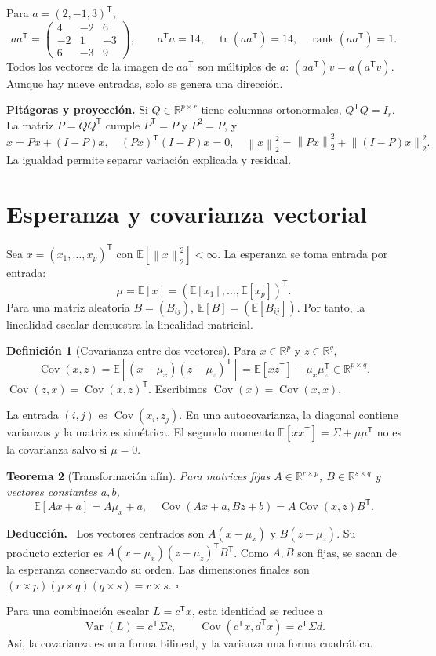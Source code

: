 \documentclass[11pt,a4paper]{article}
\newcommand{\R}{\mathbb R}
\newcommand{\E}{\mathbb E}
\newcommand{\T}{^{\mathsf T}}
\newcommand{\norm}[1]{\left\lVert #1\right\rVert}
\DeclareMathOperator{\Var}{Var}
\DeclareMathOperator{\Cov}{Cov}
\DeclareMathOperator{\tr}{tr}
\DeclareMathOperator{\rank}{rank}
\newcommand{\topic}[2]{\clearpage\section{#1}\label{#2}}
\newenvironment{deduccion}{\par\textbf{Deducción.}\ }{\hfill$\square$\par}
\newtheorem{teorema}{Teorema}[section]
\theoremstyle{definition}\newtheorem{definicion}[teorema]{Definición}
\begin{document}
\begin{ejemplo}
Para $a=(2,-1,3)\T$,
\[
aa\T=\begin{pmatrix}4&-2&6\\-2&1&-3\\6&-3&9\end{pmatrix},
\qquad a\T a=14,\quad \tr(aa\T)=14,\quad \rank(aa\T)=1.
\]
Todos los vectores de la imagen de $aa\T$ son múltiplos de $a$:
$(aa\T)v=a(a\T v)$. Aunque hay nueve entradas, solo se genera una dirección.
\end{ejemplo}
\textbf{Pitágoras y proyección.}
Si $Q\in\R^{p\times r}$ tiene columnas ortonormales, $Q\T Q=I_r$.
La matriz $P=QQ\T$ cumple $P\T=P$ y $P^2=P$, y
\[
x=Px+(I-P)x,\quad
(Px)\T(I-P)x=0,\quad
\norm x_2^2=\norm{Px}_2^2+\norm{(I-P)x}_2^2.
\]
La igualdad permite separar variación explicada y residual.

\topic{Esperanza y covarianza vectorial}{s12}
Sea $x=(x_1,\ldots,x_p)\T$ con $\E[\norm x_2^2]<\infty$.
La esperanza se toma entrada por entrada:
\[
\mu=\E[x]=(\E[x_1],\ldots,\E[x_p])\T.
\]
Para una matriz aleatoria $B=(B_{ij})$, $\E[B]=(\E[B_{ij}])$.
Por tanto, la linealidad escalar demuestra la linealidad matricial.

\begin{definicion}[Covarianza entre dos vectores]
Para $x\in\R^p$ y $z\in\R^q$,
\[
\Cov(x,z)=\E[(x-\mu_x)(z-\mu_z)\T]
=\E[xz\T]-\mu_x\mu_z\T\in\R^{p\times q}.
\]
$\Cov(z,x)=\Cov(x,z)\T$. Escribimos $\Cov(x)=\Cov(x,x)$.
\end{definicion}
La entrada $(i,j)$ es $\Cov(x_i,z_j)$. En una autocovarianza,
la diagonal contiene varianzas y la matriz es simétrica. El segundo momento
$\E[xx\T]=\Sigma+\mu\mu\T$ no es la covarianza salvo si $\mu=0$.

\begin{teorema}[Transformación afín]
Para matrices fijas $A\in\R^{r\times p}$, $B\in\R^{s\times q}$ y
vectores constantes $a,b$,
\[
\E[Ax+a]=A\mu_x+a,\quad
\boxed{\Cov(Ax+a,Bz+b)=A\Cov(x,z)B\T}.
\]
\end{teorema}
\begin{deduccion}
Los vectores centrados son $A(x-\mu_x)$ y $B(z-\mu_z)$.
Su producto exterior es
$A(x-\mu_x)(z-\mu_z)\T B\T$.
Como $A,B$ son fijas, se sacan de la esperanza conservando su orden.
Las dimensiones finales son $(r\times p)(p\times q)(q\times s)=r\times s$.
\end{deduccion}
Para una combinación escalar $L=c\T x$, esta identidad se reduce a
\[
\boxed{\Var(L)=c\T\Sigma c},\qquad
\Cov(c\T x,d\T x)=c\T\Sigma d.
\]
Así, la covarianza es una forma bilineal, y la varianza una forma cuadrática.
\end{document}
